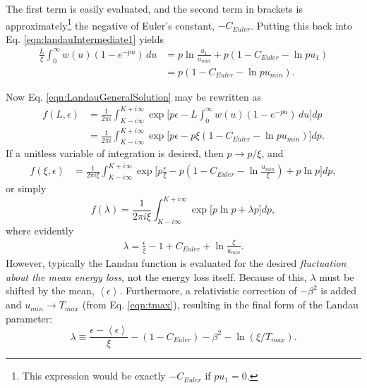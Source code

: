 The first term is easily evaluated, and the second term in brackets is approximately\footnote{This expression would be exactly $-C_{Euler}$ if $pu_1=0$.} the negative of Euler's constant, $-C_{Euler}$. Putting this back into Eq. \eqref{eqn:landauIntermediate1} yields
\begin{align*}
\frac{L}{\xi}\int_0 ^\infty w(u)  (1-e^{-pu})\, du &=p \ln\frac{u_1}{u_{min}} + p(1-C_{Euler}-\ln pu_1)\\
&=p(1-C_{Euler}-\ln pu_{min}).
\end{align*}

Now Eq. \eqref{eqn:LandauGeneralSolution} may be rewritten as
\begin{align*}
f(L,\epsilon)&=\frac{1}{2\pi i} \int_{K-i\infty} ^{K+i\infty} \exp\Big[p\epsilon-L\int_0 ^\infty w(u)  (1-e^{-pu})\, du\Big] dp\\
&= \frac{1}{2\pi i} \int_{K-i\infty} ^{K+i\infty} \exp\Big[p\epsilon-p\xi(1-C_{Euler}-\ln pu_{min})\Big] dp.
\end{align*}
If a unitless variable of integration is desired, then $p\rightarrow p/\xi$, and
\begin{align*}
f(\xi,\epsilon)&=\frac{1}{2\pi i \xi} \int_{K-i\infty} ^{K+i\infty} \exp\Big[p\frac{\epsilon}{\xi}-p(1-C_{Euler}-\ln \frac{u_{min}}{\xi})+p\ln p\Big] dp,
\end{align*}
or simply
\begin{equation}\label{eqn:landau}
f(\lambda)=\frac{1}{2\pi i \xi} \int_{K-i\infty} ^{K+i\infty} \exp\Big[p\ln p + \lambda p\Big] dp,
\end{equation}
where evidently
\begin{align*}
\lambda = \frac{\epsilon}{\xi} -1+C_{Euler}+\ln \frac{\xi}{u_{min}}.
\end{align*}
However, typically the Landau function is evaluated for the desired \emph{fluctuation about the mean energy loss}, not the energy loss itself. Because of this, $\lambda$ must be shifted by the mean, $\left< \epsilon \right>$. Furthermore, a relativistic correction of $-\beta ^2$ is added and $u_{min}\rightarrow T_{max}$ (from Eq. \eqref{eqn:tmax}), resulting in the final form of the Landau parameter:
\begin{equation}\label{eqn:landauParameter}
\lambda \equiv \frac{\epsilon-\left<\epsilon\right>}{\xi}-(1-C_{Euler})-\beta ^2 -\ln (\xi/T_{max}).
\end{equation}

